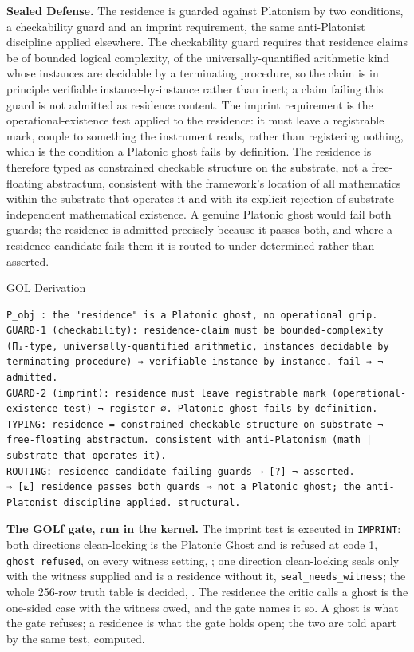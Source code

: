 \documentclass[10pt,twocolumn]{article}
\begin{document}
\textbf{Sealed Defense.} The residence is guarded against Platonism by
two conditions, a checkability guard and an imprint requirement, the
same anti-Platonist discipline applied elsewhere. The checkability guard
requires that residence claims be of bounded logical complexity, of the
universally-quantified arithmetic kind whose instances are decidable by
a terminating procedure, so the claim is in principle verifiable
instance-by-instance rather than inert; a claim failing this guard is
not admitted as residence content. The imprint requirement is the
operational-existence test applied to the residence: it must leave a
registrable mark, couple to something the instrument reads, rather than
registering nothing, which is the condition a Platonic ghost fails by
definition. The residence is therefore typed as constrained checkable
structure on the substrate, not a free-floating abstractum, consistent
with the framework's location of all mathematics within the substrate
that operates it and with its explicit rejection of
substrate-independent mathematical existence. A genuine Platonic ghost
would fail both guards; the residence is admitted precisely because it
passes both, and where a residence candidate fails them it is routed to
under-determined rather than asserted.

\begin{golbox}{GOL Derivation}
\begin{lstlisting}[style=golv]
P_obj : the "residence" is a Platonic ghost, no operational grip.
GUARD-1 (checkability): residence-claim must be bounded-complexity (Π₁-type, universally-quantified arithmetic, instances decidable by terminating procedure) ⇒ verifiable instance-by-instance. fail ⇒ ¬ admitted.
GUARD-2 (imprint): residence must leave registrable mark (operational-existence test) ¬ register ∅. Platonic ghost fails by definition.
TYPING: residence = constrained checkable structure on substrate ¬ free-floating abstractum. consistent with anti-Platonism (math | substrate-that-operates-it).
ROUTING: residence-candidate failing guards → [?] ¬ asserted.
⇒ [⟀] residence passes both guards ⇒ not a Platonic ghost; the anti-Platonist discipline applied. structural.
\end{lstlisting}
\end{golbox}

\textbf{The GOLf gate, run in the kernel.} The imprint test is executed
in \texttt{IMPRINT}: both directions clean-locking is the Platonic Ghost
and is refused at code 1, \texttt{ghost\_refused}, on every witness
setting, \texttt{}; one direction
clean-locking seals only with the witness supplied and is a residence
without it, \texttt{seal\_needs\_witness}; the whole 256-row truth table
is decided,
\texttt{}. The
residence the critic calls a ghost is the one-sided case with the
witness owed, and the gate names it so. A ghost is what the gate
refuses; a residence is what the gate holds open; the two are told apart
by the same test, computed.
\end{document}
